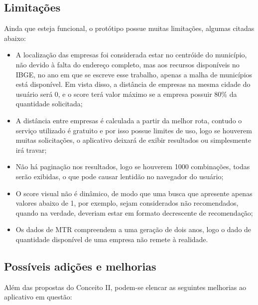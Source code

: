 \subsection{Limitações}

Ainda que esteja funcional, o protótipo possue muitas limitações, algumas citadas abaixo:

\begin{itemize} 
	\item A localização das empresas foi considerada estar no centróide do município, não devido à falta do endereço completo, mas aos recursos disponíveis no \gls{IBGE}, no ano em que se escreve esse trabalho, apenas a malha de municípios está disponível. Em vista disso, a distância de empresas na mesma cidade do usuário será 0, e o score terá valor máximo se a empresa possuir 80\% da quantidade solicitada;
  \item A distância entre empresas é calculada a partir da melhor rota, contudo o serviço utilizado é gratuito e por isso possue limites de uso, logo se houverem muitas solicitações, o aplicativo deixará de exibir resultados ou simplesmente irá travar;
  \item Não há paginação nos resultados, logo se houverem 1000 combinações, todas serão exibidas, o que pode causar lentidão no navegador do usuário;
  \item O score visual não é dinâmico, de modo que uma busca que apresente apenas valores abaixo de 1, por exemplo, sejam considerados não recomendados, quando na verdade, deveriam estar em formato decrescente de recomendação;
  \item Os dados de \gls{MTR} compreendem a uma geração de dois anos, logo o dado de quantidade disponível de uma empresa não remete à realidade.
\end{itemize}

\subsection{Possíveis adições e melhorias}

Além das propostas do Conceito II, podem-se elencar as seguintes melhorias ao aplicativo em questão:

